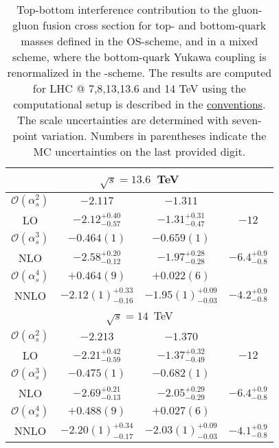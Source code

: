\begin{table}
\begin{tabular}{cccc}
  \hline
  \hline
  \multicolumn{4}{c}{$\sqrt{s}=13.6$~TeV}\\
  \hline
  $\mathcal{O}(\alpha_s^2)$ & $-2.117$ & $-1.311$ & \\
  LO & $-2.12^{+0.40}_{-0.57}$ & $-1.31^{+0.31}_{-0.47}$ & $-12$ \\
  \hline
  $\mathcal{O}(\alpha_s^3)$ & $-0.464(1)$ & $-0.659(1)$ & \\
  NLO & $-2.58^{+0.20}_{-0.12}$ & $-1.97^{+0.28}_{-0.28}$ & $-6.4^{+0.9}_{-0.8}$ \\
  \hline
  $\mathcal{O}(\alpha_s^4)$ & $+0.464(9)$ & $+0.022(6)$ & \\
  NNLO & $-2.12(1)^{+0.33}_{-0.16}$ & $-1.95(1)^{+0.09}_{-0.03}$ & $-4.2^{+0.9}_{-0.8}$ \\
  \hline
  \hline
  \multicolumn{4}{c}{$\sqrt{s}=14$~TeV}\\
  \hline
  $\mathcal{O}(\alpha_s^2)$ & $-2.213$ & $-1.370$ & \\
  LO & $-2.21^{+0.42}_{-0.59}$ & $-1.37^{+0.32}_{-0.49}$ & $-12$ \\
  \hline
  $\mathcal{O}(\alpha_s^3)$ & $-0.475(1)$ & $-0.682(1)$ & \\
  NLO & $-2.69^{+0.21}_{-0.13}$ & $-2.05^{+0.29}_{-0.29}$ & $-6.4^{+0.9}_{-0.8}$ \\
  \hline
  $\mathcal{O}(\alpha_s^4)$ & $+0.488(9)$ & $+0.027(6)$ & \\
  NNLO & $-2.20(1)^{+0.34}_{-0.17}$ & $-2.03(1)^{+0.09}_{-0.03}$ & $-4.1^{+0.9}_{-0.8}$ \\
  \end{tabular}
  \caption{Top-bottom interference contribution to the gluon-gluon fusion cross section for top- and bottom-quark masses defined in the \acs{OS}-scheme, and in a mixed scheme, where the bottom-quark Yukawa coupling is renormalized in the \MS-scheme. The results are computed for LHC @ 7,8,13,13.6 and 14 TeV using the computational setup is described in the \hyperref[chap:notation_and_conventions]{conventions}. The scale uncertainties are determined with seven-point variation. Numbers in parentheses indicate the \acs{MC} uncertainties on the last provided digit.}
  \label{tab:a3:t-b_OS}
\end{table}

